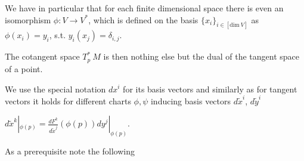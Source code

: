 We have in particular that for each finite dimensional space there is even an isomorphism \(\phi : V \to V^\ast \),
which is defined on the basis \( \{x_i\}_{i \in [\text{dim}\ V]} \) as \( \phi(x_i) = y_i \), s.t. \( y_i(x_j) = \delta_{i,j} \).

The cotangent space \( T^\ast_p\ M \) is then nothing else but the dual of the tangent space of a point.

We use the special notation \( dx^i \) for its basis vectors and similarly as for tangent vectors it holds for different
charts \( \phi, \psi \) inducing basis vectors \( d\tilde{x}^i \), \( d\tilde{y}^i \)

\( d\tilde{x}^k|_{\phi(p)} = \frac{dF^k}{d\tilde{x}^j}(\phi(p))dy^j|_{\phi(p)} \).


As a prerequisite note the following 
